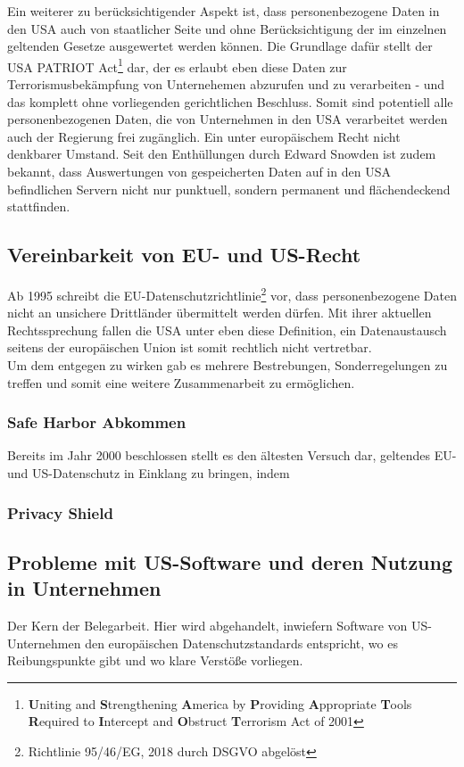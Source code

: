     Ein weiterer zu berücksichtigender Aspekt ist, dass personenbezogene Daten in den USA auch von staatlicher Seite und ohne Berücksichtigung der im einzelnen geltenden Gesetze ausgewertet werden können. Die Grundlage dafür stellt der \glqq USA PATRIOT Act\grqq{}\footnote{\textbf{U}niting and \textbf{S}trengthening \textbf{A}merica by \textbf{P}roviding \textbf{A}ppropriate \textbf{T}ools \textbf{R}equired to \textbf{I}ntercept and \textbf{O}bstruct \textbf{T}errorism Act of 2001} dar, der es erlaubt eben diese Daten zur Terrorismusbekämpfung von Unternehemen abzurufen und zu verarbeiten - und das komplett ohne vorliegenden gerichtlichen Beschluss. Somit sind potentiell alle personenbezogenen Daten, die von Unternehmen in den USA verarbeitet werden auch der Regierung frei zugänglich. Ein unter europäischem Recht nicht denkbarer Umstand. Seit den Enthüllungen durch Edward Snowden ist zudem bekannt, dass Auswertungen von gespeicherten Daten auf in den USA befindlichen Servern nicht nur punktuell, sondern permanent und flächendeckend stattfinden.\\
\subsection{Vereinbarkeit von EU- und US-Recht}
    Ab 1995 schreibt die EU-Datenschutzrichtlinie\footnote{Richtlinie 95/46/EG, 2018 durch DSGVO abgelöst} vor, dass personenbezogene Daten nicht an unsichere Drittländer übermittelt werden dürfen. Mit ihrer aktuellen Rechtssprechung fallen die USA unter eben diese Definition, ein Datenaustausch seitens der europäischen Union ist somit rechtlich nicht vertretbar.\\
    Um dem entgegen zu wirken gab es mehrere Bestrebungen, Sonderregelungen zu treffen und somit eine weitere Zusammenarbeit zu ermöglichen.

\subsubsection{Safe Harbor Abkommen}
    Bereits im Jahr 2000 beschlossen stellt es den ältesten Versuch dar, geltendes EU- und US-Datenschutz in Einklang zu bringen, indem

\subsubsection{Privacy Shield}


\subsection{Probleme mit US-Software und deren Nutzung in Unternehmen}
    Der Kern der Belegarbeit. Hier wird abgehandelt, inwiefern Software von US-Unternehmen den europäischen Datenschutzstandards entspricht, wo es Reibungspunkte gibt und wo klare Verstöße vorliegen.

